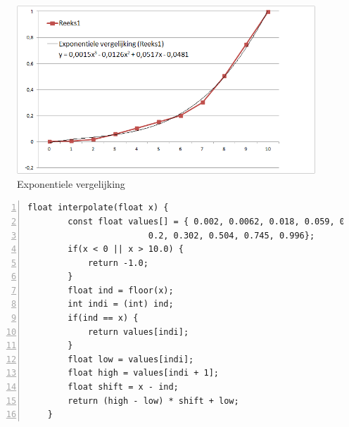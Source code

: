 \documentclass[a4paper]{article}
\begin{document}
	\begin{figure}[h]
		\centering
		\includegraphics[scale=0.8]{imgs/logaritmisch.png}
		\caption{Exponentiele vergelijking}
		\label{fig:logaritmisch}
	\end{figure}
	\newpage
	\begin{lstlisting}[caption=Linear Interpolation, label=lst:interpolate, numbers=left]
	float interpolate(float x) {
		const float values[] = { 0.002, 0.0062, 0.018, 0.059, 0.105, 0.152,
					    0.2, 0.302, 0.504, 0.745, 0.996};
		if(x < 0 || x > 10.0) {
			return -1.0;
		}
		float ind = floor(x);
		int indi = (int) ind;
		if(ind == x) {
			return values[indi];
		}
		float low = values[indi];
		float high = values[indi + 1];
		float shift = x - ind;
		return (high - low) * shift + low;
	}
	\end{lstlisting}
\end{document}
